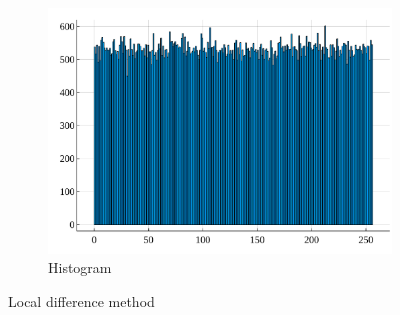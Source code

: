 \documentclass[10pt, final]{article}
\begin{document}
\begin{multicols}{2}
\begin{mdframed}
\begin{figure}[H]
        \begin{subfigure}{\textwidth}
            \centering
            \includegraphics[width = \textwidth]{../random_img/d2-histogram.pdf}
            \caption{Histogram}
        \end{subfigure}
        \caption{Local difference method}
        \label{local}
    \end{figure}
\end{mdframed}


\end{multicols}
\end{document}
